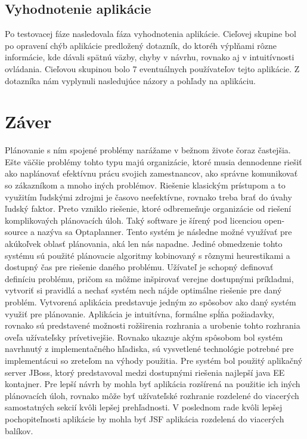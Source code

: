 \section{Vyhodnotenie aplikácie}
Po testovacej fáze nasledovala fáza vyhodnotenia aplikácie. Cieľovej skupine bol po opravení chýb aplikácie predložený dotazník, do ktoréh výplňami rôzne informácie, kde dávali spätnú väzby, chyby v návrhu, rovnako aj v intuitívnosti ovládania. Cieľovou skupinou bolo 7 eventuálnych používateľov tejto aplikácie. Z dotazníka nám vyplynuli nasledujúce názory a pohľady na aplikáciu.


















\chapter{Záver}
Plánovanie s ním spojené problémy narážame v bežnom živote čoraz častejšia. Ešte väčšie problémy tohto typu majú organizácie, ktoré musia dennodenne riešiť ako naplánovať efektívnu prácu svojich zamestnancov, ako správne komunikovať so zákazníkom a mnoho iných problémov. Riešenie klasickým prístupom a to využitím ľudskými zdrojmi je časovo neefektívne, rovnako treba brať do úvahy ľudský faktor. Preto vzniklo riešenie, ktoré odbremeňuje organizácie od riešení komplikovaých plánovacích úloh. Taký software je šírený pod licenciou open-source a nazýva sa Optaplanner. Tento systém je následne možné využívať pre akúkoľvek oblasť plánovania, aká len nás napadne. Jediné obmedzenie tohto systému sú použité plánovacie algoritmy kobinovaný s rôznymi heurestikami a dostupný čas pre riešenie daného problému. Užívateľ je schopný definovať definíciu problému, pričom sa môžme inšpirovať verejne dostupnými príkladmi, vytvoriť si pravidlá a nechať systém nech nájde optimálne riešenie pre daný problém. Vytvorená aplikácia predstavuje jedným zo spôsobov ako daný systém využiť pre plánovanie. Aplikácia je intuitívna, formálne spĺňa požiadavky, rovnako sú predstavené možnosti rožširenia rozhrania a urobenie tohto rozhrania oveľa užívateľsky prívetivejšie.  Rovnako ukazuje akým spôsobom bol systém navrhnutý z implementačného hľadiska, sú vysvetlené technológie potrebné pre implementácui so zreteľom na výhody použitia. Pre systém bol použitý aplikačný server JBoss, ktorý predstavoval medzi dostupnými riešenia najlepší java EE kontajner. Pre lepší návrh by mohla byť aplikácia rozšírená na použitie ich iných plánovacích úloh, rovnako môže byť užívateľské rozhranie rozdelené do viacerých samostatných sekcií kvôli lepšej prehľadnosti. V poslednom rade kvôli lepšej pochopiteľnosti aplikácie by mohla byť JSF aplikácia rozdelená do viacerých balíkov.


